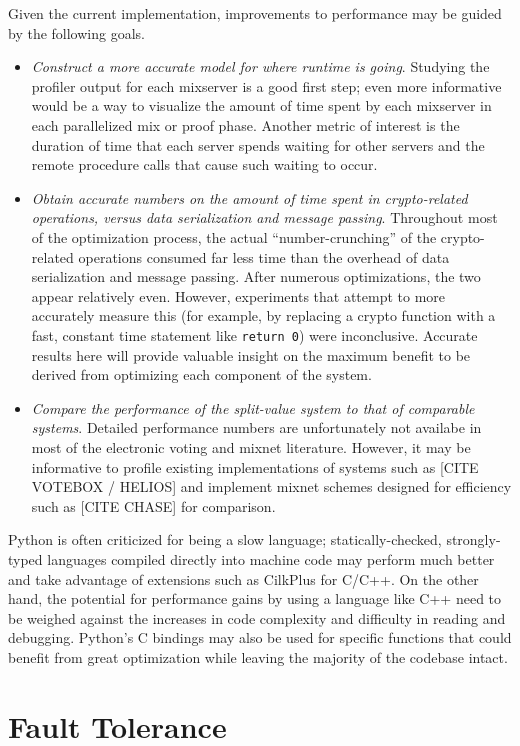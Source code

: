 Given the current implementation, improvements to performance may be guided by the following goals.
\begin{itemize}
\item \emph{Construct a more accurate model for where runtime is going}. Studying the profiler output for each mixserver is a good first step; even more informative would be a way to visualize the amount of time spent by each mixserver in each parallelized mix or proof phase. Another metric of interest is the duration of time that each server spends waiting for other servers and the remote procedure calls that cause such waiting to occur.
\item \emph{Obtain accurate numbers on the amount of time spent in crypto-related operations, versus data serialization and message passing}. Throughout most of the optimization process, the actual ``number-crunching'' of the crypto-related operations consumed far less time than the overhead of data serialization and message passing. After numerous optimizations, the two appear relatively even. However, experiments that attempt to more accurately measure this (for example, by replacing a crypto function with a fast, constant time statement like \texttt{return 0}) were inconclusive. Accurate results here will provide valuable insight on the maximum benefit to be derived from optimizing each component of the system.
\item \emph{Compare the performance of the split-value system to that of comparable systems}. Detailed performance numbers are unfortunately not availabe in most of the electronic voting and mixnet literature. However, it may be informative to profile existing implementations of systems such as [CITE VOTEBOX / HELIOS] and implement mixnet schemes designed for efficiency such as [CITE CHASE] for comparison.
\end{itemize}

Python is often criticized for being a slow language; statically-checked, strongly-typed languages compiled directly into machine code may perform much better and take advantage of extensions such as CilkPlus for C/C++. On the other hand, the potential for performance gains by using a language like C++ need to be weighed against the increases in code complexity and difficulty in reading and debugging. Python's C bindings may also be used for specific functions that could benefit from great optimization while leaving the majority of the codebase intact.

\section{Fault Tolerance}

